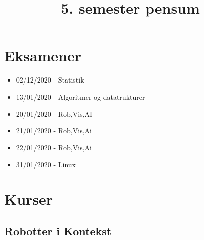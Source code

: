 \documentclass[a4paper,11pt]{article}
\begin{document}
\title{5. semester pensum}
\date{}
\maketitle
\vspace{-2cm}

\tableofcontents
\section{Eksamener}

\begin{itemize}
    \item 02/12/2020 - Statistik
    \item 13/01/2020 - Algoritmer og datatrukturer
    \item 20/01/2020 - Rob,Vis,AI
    \item 21/01/2020 - Rob,Vis,Ai
    \item 22/01/2020 - Rob,Vis,Ai
    \item 31/01/2020 - Linux
\end{itemize}

\section{Kurser}

\subsection{Robotter i Kontekst}
\end{document}
